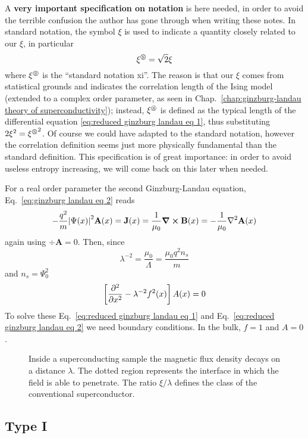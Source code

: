 A \textbf{very important specification on notation} is here needed, in order to avoid the terrible confusion the author has gone through when writing these notes. In standard notation, the symbol $\xi$ is used to indicate a quantity closely related to our $\xi$, in particular
\[
    \xi^\circledS = \sqrt{2} \xi
\]
where $\xi^\circledS$ is the ``standard notation xi''. The reason is that our $\xi$ comes from statistical grounds and indicates the correlation length of the Ising model (extended to a complex order parameter, as seen in Chap.~\ref{chap:ginzburg-landau theory of superconductivity}); instead, $\xi^\circledS$ is defined as the typical length of the differential equation \eqref{eq:reduced ginzburg landau eq 1}, thus substituting $2\xi^2 = {\xi^\circledS}^2$. Of course we could have adapted to the standard notation, however the correlation definition seems just more physically fundamental than the standard definition. This specification is of great importance: in order to avoid useless entropy increasing, we will come back on this later when needed.

For a real order parameter the second Ginzburg-Landau equation, Eq.~\eqref{eq:ginzburg landau eq 2} reads
\[  
    - \frac{q^2}{m} \abs{\Psi (x)}^2 \mathbf{A}(x) = \mathbf{J}(x) = \frac{1}{\mu_0} \curl\mathbf{B}(x) = -\frac{1}{\mu_0} \laplacian\mathbf{A}(x)
\]
again using $\div\mathbf{A}=0$. Then, since
\[
    \lambda^{-2} = \frac{\mu_0}{\Lambda} = \frac{\mu_0 q^2 n_s}{m}
\]
and $n_s = \Psi_0^2$
\begin{equation}\label{eq:reduced ginzburg landau eq 2}
    \left[{\pdv[2]{}{x} - \lambda^{-2} f^2(x)}\right] A(x) = 0
\end{equation}
To solve these Eq.~\eqref{eq:reduced ginzburg landau eq 1} and Eq.~\eqref{eq:reduced ginzburg landau eq 2} we need boundary conditions. In the bulk, $f=1$ and $A=0$.

\begin{figure}
    \centering
    
    \caption{Inside a superconducting sample the magnetic flux density decays on a distance $\lambda$. The dotted region represents the interface in which the field is able to penetrate. The ratio $\xi/\lambda$ defines the class of the conventional superconductor.}
    \label{fig:field in the sample}
\end{figure}

\subsection{Type I}

